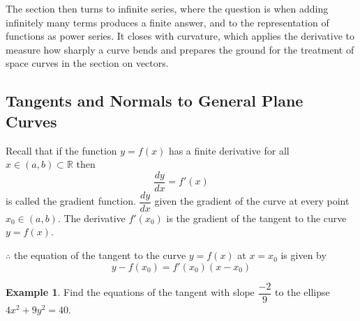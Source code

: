 \documentclass[11pt,a4paper]{article}
\theoremstyle{definition}
\newtheorem{exa}[thm]{Example}
\begin{document}
The section then turns to infinite series, where the question is when adding
infinitely many terms produces a finite answer, and to the representation of
functions as power series. It closes with curvature, which applies the
derivative to measure how sharply a curve bends and prepares the ground for the
treatment of space curves in the section on vectors.


\subsection{Tangents and Normals to General Plane Curves}
Recall that if the function $y = f(x)$ has a finite derivative for all $x \in (a,b)\subset \mathbb{R}$ then $$\frac{dy}{dx} = f'(x)$$ is called the gradient function. $\dfrac{dy}{dx}$ given the gradient of the curve at every point $x_0 \in (a,b)$. The derivative $f'(x_0)$ is the gradient of the tangent to the curve $y= f(x)$.


$\therefore$ the equation of the tangent to the curve $y = f(x)$ at $x = x_0$ is given by $$\boxed{y - f(x_0) = f'(x_0)(x - x_0)}$$


\begin{exa}


Find the equations of the tangent with slope $\dfrac{-2}{9}$ to the ellipse $4x^2 + 9y^2 = 40$.
\end{exa}
\end{document}
